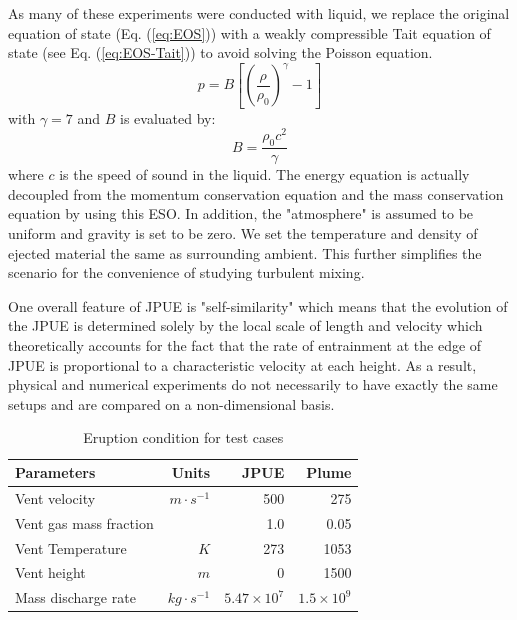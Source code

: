 As many of these experiments were conducted with liquid, we replace the original equation of state (Eq. (\ref{eq:EOS})) with a weakly compressible Tait equation of state \citep {becker2007weakly} (see Eq. (\ref{eq:EOS-Tait})) to avoid solving the Poisson equation.
\begin{equation}
p=B\left[\left(\dfrac{\rho}{\rho_0}\right)^{\gamma}-1\right]
\label{eq:EOS-Tait}
\end{equation}
with $\gamma=7$ and $B$ is evaluated by:
\begin{equation}
B=\dfrac{\rho_0 c^2}{\gamma}
\end{equation}
where $c$ is the speed of sound in the liquid. The energy equation is actually decoupled from the momentum conservation equation and the mass conservation equation by using this ESO. In addition, the "atmosphere" is assumed to be uniform and gravity is set to be zero. We set the temperature and density of ejected material the same as surrounding ambient. This further simplifies the scenario for the convenience of studying turbulent mixing. 

One overall feature of JPUE is "self-similarity" which means that the evolution of the JPUE is determined solely by the local scale of length and velocity which theoretically accounts for the fact that the rate of entrainment at the edge of JPUE is proportional to a characteristic velocity at each height. As a result, physical and numerical experiments do not necessarily to have exactly the same setups and are compared on a non-dimensional basis.

\begin{table}[htp]
\centering
	\begin{centering}
      \caption{Eruption condition for test cases}		
	  \begin{tabular}{lrrr}
	    \hline
	    Parameters & Units  & JPUE & Plume \\
	    \hline
	    Vent velocity          & $m\cdot s^{-1}$  & 500               & 275 \\
	    Vent gas mass fraction &                  & 1.0               & 0.05 \\
	    Vent Temperature       & $K$              & 273               & 1053 \\
	    Vent height            & $m$              & 0                 & 1500 \\
	    Mass discharge rate    & $kg\cdot s^{-1}$ & $5.47 \times 10^7$ & $1.5 \times 10^9$\\
	    \hline
	  \end{tabular}
	  \label{tab:input_parameters}
	\end{centering}
\end{table}

